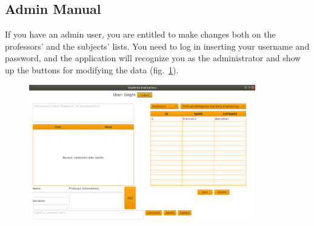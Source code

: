\documentclass[a4paper, oneside]{article}
\begin{document}
\clearpage
\subsection{Admin Manual}
If you have an admin user, you are entitled to make changes both on the professors' and the subjects' lists. You need to log in inserting your username and password, and the application will recognize you as the administrator and show up the buttons for modifying the data (fig.~\ref{fig:adminLogin}).

\begin{figure}[h]
\centering
\includegraphics[width=0.88\textwidth]{images/screens/adminLogin}
\label{fig:adminLogin}
\end{figure}
\end{document}
